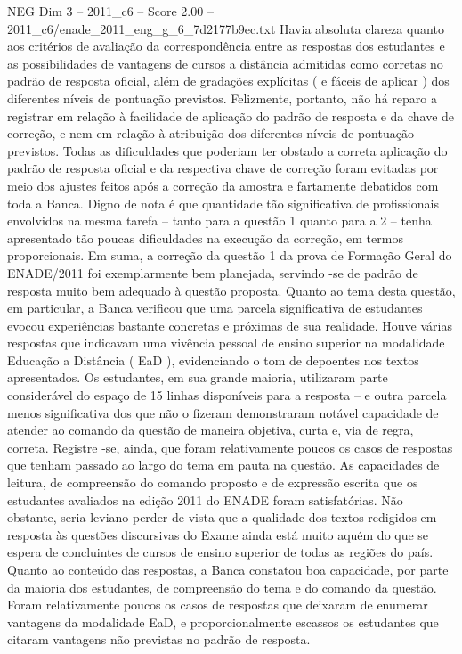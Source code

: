 \begin{textsample}{NEG Dim 3 – 2011\_c6 – Score 2.00 – 2011\_c6/enade\_2011\_eng\_g\_6\_7d2177b9ec.txt}
Havia absoluta clareza quanto aos critérios de avaliação da correspondência entre as respostas dos estudantes e as possibilidades de vantagens de cursos a distância admitidas como corretas no padrão de resposta oficial, além de gradações explícitas ( e fáceis de aplicar ) dos diferentes níveis de pontuação previstos.
Felizmente, portanto, não há reparo a registrar em relação à facilidade de aplicação do padrão de resposta e da chave de correção, e nem em relação à atribuição dos diferentes níveis de pontuação previstos.
Todas as dificuldades que poderiam ter obstado a correta aplicação do padrão de resposta oficial e da respectiva chave de correção foram evitadas por meio dos ajustes feitos após a correção da amostra e fartamente debatidos com toda a Banca.
Digno de nota é que quantidade tão significativa de profissionais envolvidos na mesma tarefa – tanto para a questão 1 quanto para a 2 – tenha apresentado tão poucas dificuldades na execução da correção, em termos proporcionais.
Em suma, a correção da questão 1 da prova de Formação Geral do ENADE/2011 foi exemplarmente bem planejada, servindo -se de padrão de resposta muito bem adequado à questão proposta.
Quanto ao tema desta questão, em particular, a Banca verificou que uma parcela significativa de estudantes evocou experiências bastante concretas e próximas de sua realidade.
Houve várias respostas que indicavam uma vivência pessoal de ensino superior na modalidade Educação a Distância ( EaD ), evidenciando o tom de depoentes nos textos apresentados.
Os estudantes, em sua grande maioria, utilizaram parte considerável do espaço de 15 linhas disponíveis para a resposta – e outra parcela menos significativa dos que não o fizeram demonstraram notável capacidade de atender ao comando da questão de maneira objetiva, curta e, via de regra, correta.
Registre -se, ainda, que foram relativamente poucos os casos de respostas que tenham passado ao largo do tema em pauta na questão.
As capacidades de leitura, de compreensão do comando proposto e de expressão escrita que os estudantes avaliados na edição 2011 do ENADE foram satisfatórias.
Não obstante, seria leviano perder de vista que a qualidade dos textos redigidos em resposta às questões discursivas do Exame ainda está muito aquém do que se espera de concluintes de cursos de ensino superior de todas as regiões do país.
Quanto ao conteúdo das respostas, a Banca constatou boa capacidade, por parte da maioria dos estudantes, de compreensão do tema e do comando da questão.
Foram relativamente poucos os casos de respostas que deixaram de enumerar vantagens da modalidade EaD, e proporcionalmente escassos os estudantes que citaram vantagens não previstas no padrão de resposta.

\end{textsample}
